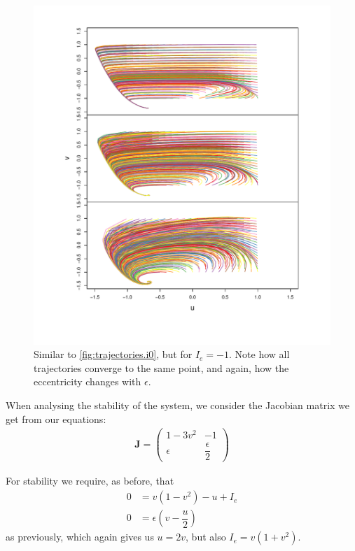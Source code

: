 \documentclass[10pt]{article}\usepackage[]{graphicx}\usepackage[]{color}
\makeatletter
\def\maxwidth{ %
  \ifdim\Gin@nat@width>\linewidth
    \linewidth
  \else
    \Gin@nat@width
  \fi
}
\newcommand{\matr}[1]{\mathbf{#1}}
\theoremstyle{plain}
\makeatother
\begin{document}
\begin{multicols*}{2}
\begin{Schunk}
\begin{figure}[H]
{\centering \includegraphics[width=\maxwidth]{../figures/twocolumn-trajectories_i-1-1} 

}

\caption{Similar to \cref{fig:trajectories.i0}, but for $I_e = -1$. Note how all trajectories converge to the same point, and again, how the eccentricity changes with $\epsilon$.}\label{fig:trajectories.i-1}
\end{figure}
\end{Schunk}
	
	When analysing the stability of the system, we consider the Jacobian matrix we get from our equations:
	\begin{align}
	\matr J =  \left(
  	\begin{matrix}
      1 - 3v^2  & -1                   \\
      \epsilon  & \dfrac{\epsilon}{2}
    \end{matrix}
    \right)
	\end{align}
	
	For stability we require, as before, that 
	\begin{align}
  	0 &= v(1-v^2) -u + I_e \\
  	0 &= \epsilon (v - \dfrac{u}{2})
	\end{align}
	as previously, which again gives us $u = 2v$, but also $I_e = v(1 + v^2)$.
	

\end{multicols*}
\end{document}
